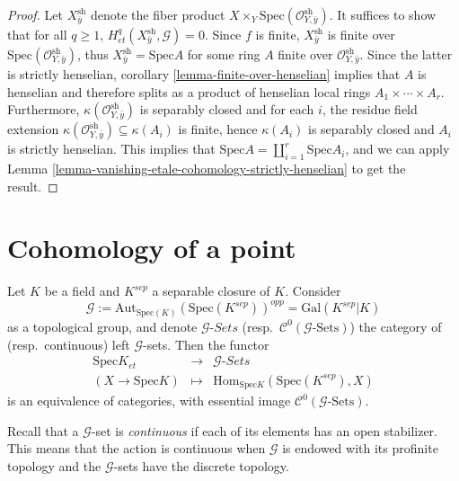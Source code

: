 \begin{proof}
Let $X_{\bar y}^\text{sh}$ denote the fiber product $X\times_Y
\text{Spec}(\mathcal{O}_{Y, \bar y}^\text{sh})$. It suffices to show that for
all $q\geq 1$, $H_{et}^q(X_{\bar y}^\text{sh}, \mathcal{G})=0$. Since $f$ is
finite, $X_{\bar y}^\text{sh}$ is finite over $\text{Spec}(\mathcal{O}_{Y, \bar
y}^\text{sh})$, thus $X_{\bar y}^\text{sh} = \text{Spec} A$ for some ring $A$
finite over $\mathcal{O}_{Y, \bar y}^\text{sh}$. Since the latter is strictly
henselian, corollary \ref{lemma-finite-over-henselian} implies that $A$
is henselian and therefore splits as a product of henselian local rings $A_1
\times \cdots \times A_r$. Furthermore, $\kappa(\mathcal{O}_{Y, \bar
y}^\text{sh})$ is separably closed and for each $i$, the residue field
extension $\kappa(\mathcal{O}_{Y, \bar y}^\text{sh}) \subseteq \kappa(A_i)$ is
finite, hence $\kappa(A_i)$ is separably closed and $A_i$ is strictly
henselian. This implies that $\text{Spec} A = \coprod_{i=1}^r \text{Spec} A_i$,
and we can apply
Lemma \ref{lemma-vanishing-etale-cohomology-strictly-henselian} to get
the result.
\end{proof}





\section{Cohomology of a point}
\label{section-cohomology-point}

\begin{lemma}
\label{lemma-sheaves-point}
Let $K$ be a field and $K^{sep}$ a separable closure of $K$. Consider
$$
\mathcal{G} := \text{Aut}_{\text{Spec}(K)}(\text{Spec}(K^{sep}))^{opp} =
\text{Gal}(K^{sep} | K)
$$
as a topological group, and denote $\mathcal{G}\textit{-Sets}$
(resp.\ $\mathcal{C}^0(\mathcal{G}\text{-Sets})$)
the category of (resp.\ continuous) left $\mathcal{G}$-sets.
Then the functor
$$
\begin{matrix}
\text{Spec} K _{et} & \longrightarrow & \mathcal{G}\textit{-Sets} \\
(X\to\text{Spec} K) & \longmapsto & \text{Hom}_{\text{Spec}
K}\left(\text{Spec}(K^{sep}), X\right)
\end{matrix}
$$
is an equivalence of categories, with essential image
$\mathcal{C}^0(\mathcal{G}\text{-Sets})$.
\end{lemma}

\noindent
Recall that a $\mathcal{G}$-set is {\it continuous} if each of its elements
has an open stabilizer. This means that the action is continuous when
$\mathcal{G}$ is endowed with its profinite topology and the $\mathcal{G}$-sets
have the discrete topology.

